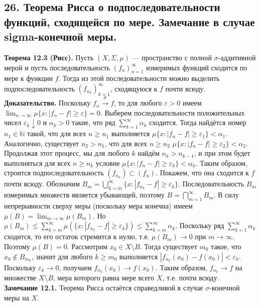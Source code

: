 \documentclass[12pt]{article}
\begin{document}
\subsection*{26. Теорема Рисса о подпоследовательности функций, сходящейся по мере. Замечание в
случае sigma-конечной меры.}
\textbf{Теорема 12.3 (Рисс).} Пусть $(X,\Sigma,\mu)$ — пространство с полной $\sigma$-аддитивной мерой и пусть последовательность $(f_n)_{n=1}^\infty$ измеримых функций сходится по мере к функции $f$. Тогда из этой последовательности можно выделить подпоследовательность $(f_{n_k})_{k=1}^\infty$, сходящуюся к $f$ почти всюду. \textbf{Доказательство.} Поскольку $f_n\overset{\mu}{\longrightarrow}f$, то для любого $\varepsilon>0$ имеем $\lim_{n\to\infty}\mu\{x:|f_n-f|\geq\varepsilon\}=0$. Выберем последовательности положительных чисел $\varepsilon_k\downarrow 0$ и $\alpha_k>0$ такие, что ряд $\sum_{k=1}^\infty\alpha_k$ сходится. Тогда найдётся номер $n_1\in\mathbb{N}$ такой, что для всех $n\geq n_1$ выполняется $\mu\{x:|f_n-f|\geq\varepsilon_1\}<\alpha_1$. Аналогично, существует $n_2>n_1$, что для всех $n\geq n_2$ $\mu\{x:|f_n-f|\geq\varepsilon_2\}<\alpha_2$. Продолжая этот процесс, мы для любого $k$ найдём $n_k>n_{k-1}$, и при этом будет выполняться для всех $n\geq n_k$ условие $\mu\{x:|f_n-f|\geq\varepsilon_k\}<\alpha_k$. Таким образом, строится подпоследовательность $(f_{n_k})\subset(f_n)$. Покажем, что она сходится к $f$ почти всюду. Обозначим $B_m=\bigcup_{k=m}^\infty\{x:|f_{n_k}-f|\geq\varepsilon_k\}$. Последовательность $B_m$ измеримых множеств является убывающей, поэтому $B=\bigcap_{m=1}^\infty B_m$. В силу непрерывности сверху меры (поскольку мера конечна) имеем $\mu(B)=\lim_{m\to\infty}\mu(B_m)$. Но $\mu(B_m)\leq\sum_{k=m}^\infty\mu(\{x:|f_{n_k}-f|\geq\varepsilon_k\})\leq\sum_{k=m}^\infty\alpha_k$. Поскольку ряд $\sum_{k=1}^\infty\alpha_k$ сходится, то его остаток стремится к нулю, т.е. $\mu(B_m)\to 0$ при $m\to\infty$. Поэтому $\mu(B)=0$. Рассмотрим $x_0\in X\setminus B$. Тогда существует $m_0$ такое, что $x_0\notin B_{m_0}$, значит для любого $k\geq m_0$ выполняется $|f_{n_k}(x_0)-f(x_0)|<\varepsilon_k$. Поскольку $\varepsilon_k\to 0$, получаем $f_{n_k}(x_0)\to f(x_0)$. Таким образом, $f_{n_k}\to f$ на множестве $X\setminus B$, мера которого равна мере всего $X$, т.е. почти всюду. \\\textbf{Замечание 12.1.} Теорема Рисса остаётся справедливой в случае $\sigma$-конечной меры на $X$.

\end{document}
